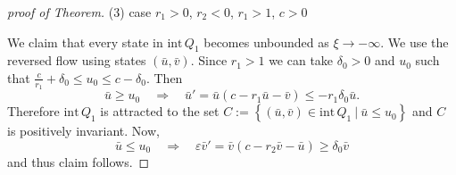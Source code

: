 \documentclass{amsart}
\def\red{\color{red}}
\theoremstyle{definition}
\numberwithin{equation}{section}
\def\ii{{\textrm{int}}\,}
\begin{document}
\begin{proof}[proof of Theorem]
% 
% 
\bigskip\bigskip


(3) case $r_1>0$, $r_2<0$, $r_1 >1$, $c>0$

We claim that every state in $\ii Q_1$ becomes unbounded as $\xi \rightarrow -\infty.$ We use the reversed flow using states $(\bar u, \bar v)$. Since $r_1>1$ we can take $\delta_0>0$ and $u_0$  such that $\frac{c}{r_1} + \delta_0 \le u_0 \le c-\delta_0$. Then
$$ \bar u \ge u_0 \quad \Longrightarrow \quad \bar u' = \bar u (c-r_1\bar u -\bar v) \le -r_1\delta_0 \bar u.$$
Therefore $\ii Q_1$ is attracted to the set $C:=\left\{(\bar u , \bar v) \in \ii Q_1 ~|~ \bar u\le u_0\right\}$ and $C$ is positively invariant. Now,
$$ \bar u \le u_0 \quad \Longrightarrow \quad \varepsilon\bar v' = \bar v(c-r_2\bar v - \bar u) \ge \delta_0 \bar v$$
and thus claim follows.
\bigskip\bigskip


\end{proof}
\end{document}
